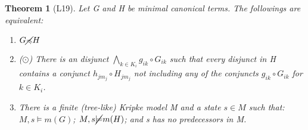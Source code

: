 \documentclass[10pt]{article}
\newcommand{\cle}{\preccurlyeq}
\newtheorem{theorem}{Theorem}
\begin{document}
		\begin{theorem}[L19]\label{th24}
			Let G and H be minimal canonical terms. The followings are equivalent:
			\begin{enumerate}
				\item  $G \cancel{\cle}H$
				\item ($\odot$) There is an disjunct $\bigwedge_{k \in K_i} g_{ik}\circ G_{ik}$ such that every disjunct in H contains a conjunct $h_{jm_j} \circ H_{jm_j}$ not including any of the conjuncts $g_{ik} \circ G_{ik}$ for $k\in K_i$.
				\item There is a finite (tree-like) Kripke model M and a state $s\in M$ such that: $M,s \models m(G)$; $M,s \cancel{\models}m(H)$; and s has no predecessors in M.
			\end{enumerate}
		\end{theorem}
\end{document}
